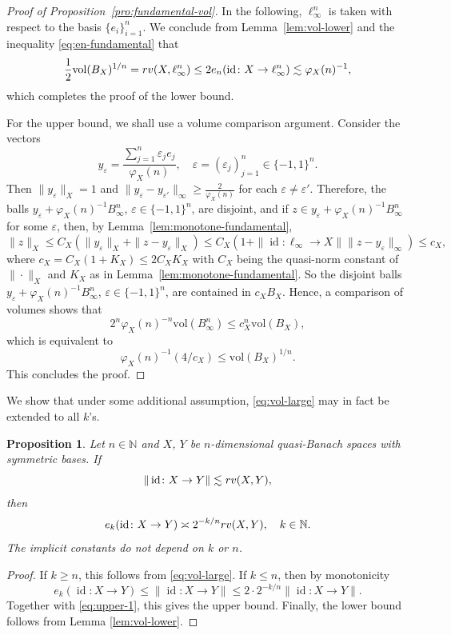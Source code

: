 \documentclass[a4paper,12pt]{article}
\newtheorem{prop}[thm]{Proposition}
\theoremstyle{definition}
\newcommand{\IN}{\mathbb{N}}
\newcommand{\vol}{\mathrm{vol}}
\DeclareMathOperator{\id}{id}
\begin{document}
\begin{proof}[Proof of Proposition~\ref{pro:fundamental-vol}]

In the following, $\ell_{\infty}^n$ is taken with respect to the basis $\{e_i\}_{i=1}^n$. We conclude from Lemma~\ref{lem:vol-lower} and the inequality \eqref{eq:en-fundamental} that
\[
\frac{1}{2}\vol(B_X)^{1/n}
={\rm rv}(X,\ell_{\infty}^n)
\le 2 e_n(\id\colon X\to \ell_{\infty}^n)
\lesssim \varphi_X(n)^{-1},
\]
which completes the proof of the lower bound.

For the upper bound, we shall use a volume comparison argument. Consider the vectors 
\[
y_{\varepsilon}=\frac{\sum_{j=1}^{n}\varepsilon_je_j}{\varphi_X(n)} ,\quad \varepsilon=(\varepsilon_j)_{j=1}^n\in \{-1,1\}^n.
\]
Then $\|y_{\varepsilon}\|_X=1$ and $\|y_{\varepsilon}-y_{\varepsilon'}\|_{\infty}\ge \frac{2}{\varphi_X(n)}$ for each $\varepsilon\neq \varepsilon'$. Therefore, the balls $y_{\varepsilon}+\varphi_X(n)^{-1}B_{\infty}^n$, $\varepsilon\in\{-1,1\}^n$, are disjoint, and if $z\in y_{\varepsilon}+\varphi_X(n)^{-1}B_{\infty}^n$ for some $\varepsilon$, then, by Lemma~\ref{lem:monotone-fundamental}, 
\[
\|z\|_X
\le C_X(\|y_{\varepsilon}\|_X + \|z-y_{\varepsilon}\|_X)
\le C_X(1 + \|\id\colon \ell_{\infty}\to X \|\|z-y_{\varepsilon}\|_{\infty})
\le c_X,
\]
where $c_X=C_X(1+K_X)\le 2C_X K_X$ with $C_X$ being the quasi-norm constant of $\|\cdot\|_X$ and $K_X$ as in Lemma~\ref{lem:monotone-fundamental}.
So the disjoint balls $y_{\varepsilon}+\varphi_X(n)^{-1}B_{\infty}^n$, $\varepsilon\in\{-1,1\}^n$, are contained in $c_X B_{X}$. Hence, a comparison of volumes shows that
\[
 2^n\varphi_X(n)^{-n}\vol(B_{\infty}^n) \le  c_X^n \vol(B_X),
\]
which is equivalent to
\[
\varphi_X(n)^{-1} (4/c_X )\le \vol(B_X)^{1/n}.
\]
This concludes the proof.
\end{proof}


We show that under some additional assumption, \eqref{eq:vol-large} may in fact be extended to all $k$'s.


\begin{prop}\label{pro:vol-upper}
Let $n\in\IN$ and $X$, $Y$ be $n$-dimensional quasi-Banach spaces with symmetric bases. If 
\begin{equation} \label{eq:upper-1}
	\|\id\colon X\to Y\| \lesssim  {\rm rv}(X,Y),%
\end{equation}
then
\[
e_k(\id\colon X\to Y) \asymp 2^{-k/n}{\rm rv}(X,Y),\quad k\in\IN.
\]
The implicit constants do not depend on $k$ or $n$.
\end{prop}
\begin{proof}
If $k\ge n$, this follows from \eqref{eq:vol-large}. If $k\le n$, then by monotonicity
\[
e_k(\id\colon X\to Y)
\le \|\id\colon X\to Y\|
\le 2\cdot 2^{-k/n}\|\id\colon X\to Y\|.
\]
Together with \eqref{eq:upper-1}, this gives the upper bound. Finally, the lower bound follows from Lemma \ref{lem:vol-lower}.
\end{proof}
\end{document}
